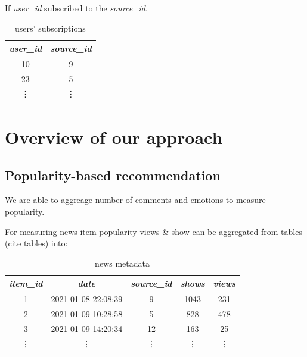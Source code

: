 \documentclass{article}
\begin{document}
    If \emph{user\_id} subscribed to the \emph{source\_id}.

    \begin{table}[h]
        \centering
        \begin{tabular}{cc}
            \toprule

            \emph{user\_id} & \emph{source\_id} \\\midrule

            10 & 9  \\
            23 & 5  \\
            \vdots & \vdots  \\\bottomrule

        \end{tabular}

        \caption{users' subscriptions}
        \label{tab:subscriptions}
    \end{table}




    \section{Overview of our approach}
    \label{sec:overview}

    \subsection{Popularity-based recommendation}

    We are able to aggreage number of comments and emotions to measure popularity.

    For measuring news item popularity views \& show can be aggregated from tables (cite tables) into: 

    \begin{table}[h]
        \centering
        \begin{tabular}{ccccc}
            \toprule

            \emph{item\_id} & \emph{date} & \emph{source\_id} & \emph{shows}                                                               & \emph{views}                                                 \\\midrule

        1 & 2021-01-08 22:08:39 & 9  & 1043 & 231        \\
        2 & 2021-01-09 10:28:58 & 5  & 828 & 478  \\
        3 & 2021-01-09 14:20:34 & 12 & 163 & 25 \\
        \vdots & \vdots & \vdots & \vdots & \vdots \\\bottomrule


         \hline
        \end{tabular}

        \caption{news metadata}
        \label{tab:meta}
    \end{table}
\end{document}

